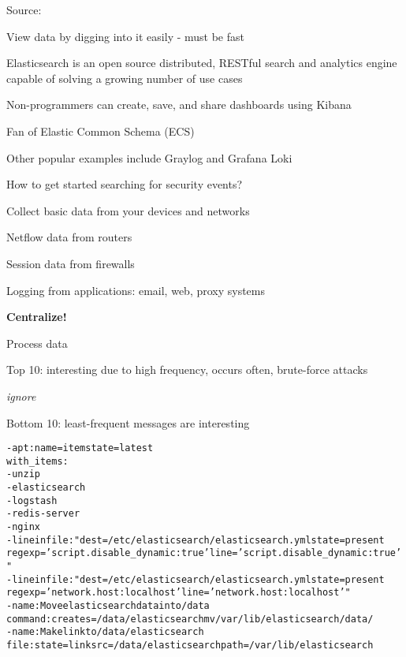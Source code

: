 \documentclass[Screen16to9,17pt]{foils}
\begin{document}

Source: 

\begin{list2}
\item View data by digging into it easily - must be fast
\item Elasticsearch is an open source distributed, RESTful search and analytics engine capable of solving a growing number of use cases
\item Non-programmers can create, save, and share dashboards using Kibana
\item Fan of Elastic Common Schema (ECS) 
\item Other popular examples include Graylog and Grafana Loki
\end{list2}



\begin{list1}
\item How to get started searching for security events?
\item Collect basic data from your devices and networks
\begin{list2}
\item Netflow data from routers
\item Session data from firewalls
\item Logging from applications: email, web, proxy systems
\end{list2}
\item {\bf Centralize!}
\item Process data
\begin{list2}
\item Top 10: interesting due to high frequency, occurs often, brute-force attacks
\item {\it ignore}
\item Bottom 10: least-frequent messages are interesting
\end{list2}
\end{list1}





\begin{alltt}\small
- apt: name={{ item }} state=latest
  with_items:
        - unzip
        - elasticsearch
        - logstash
        - redis-server
        - nginx
- lineinfile: "dest=/etc/elasticsearch/elasticsearch.yml state=present
  regexp='script.disable_dynamic: true' line='script.disable_dynamic: true'"
- lineinfile: "dest=/etc/elasticsearch/elasticsearch.yml state=present
  regexp='network.host: localhost' line='network.host: localhost'"
- name: Move elasticsearch data into /data
  command: creates=/data/elasticsearch mv /var/lib/elasticsearch /data/
- name: Make link to /data/elasticsearch
  file: state=link src=/data/elasticsearch path=/var/lib/elasticsearch
\end{alltt}
\vskip 5mm
\end{document}
